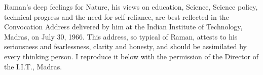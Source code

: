 Raman's deep feelings for Nature, his views on education, Science, Science policy, technical progress and the need for self-reliance, are best reflected in the Convocation Address delivered by him at the Indian Institute of Technology, Madras, on July 30, 1966. This address, so typical of Raman, attests to his seriousness and fearlessness, clarity and honesty, and should be assimilated by every thinking person. I reproduce it below with the permission of the Director of the I.I.T., Madras.

\newpage

\smallskip




